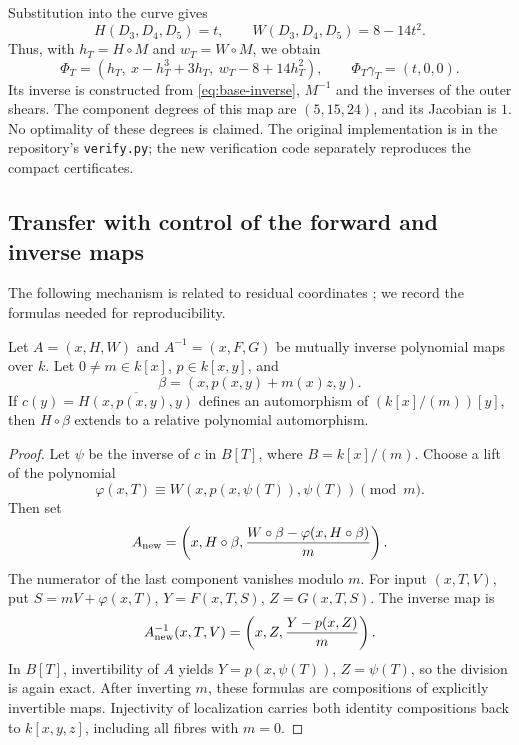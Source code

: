 Substitution into the curve gives
\[
 H(D_3,D_4,D_5)=t,\qquad W(D_3,D_4,D_5)=8-14t^2.
\]
Thus, with $h_T=H\circ M$ and $w_T=W\circ M$, we obtain
\begin{equation}\label{eq:trefoil-rectifier}
 \Phi_T=(h_T,\ x-h_T^3+3h_T,\ w_T-8+14h_T^2),
 \qquad \Phi_T\gamma_T=(t,0,0).
\end{equation}
Its inverse is constructed from \eqref{eq:base-inverse}, $M^{-1}$ and the
inverses of the outer shears. The component degrees of this map are
$(5,15,24)$, and its Jacobian is $1$. No optimality of these degrees is claimed.
The original implementation is in the repository's \texttt{verify.py};
the new verification code separately reproduces the compact certificates.

\subsection{Transfer with control of the forward and inverse maps}
The following mechanism is related to residual coordinates
\cite{BD1993,EV2001,Lewis2024}; we record the formulas needed for
reproducibility.

\begin{proposition}\label{prop:transfer-app2}
Let $A=(x,H,W)$ and $A^{-1}=(x,F,G)$ be mutually inverse polynomial
maps over $k$. Let $0\ne m\in k[x]$, $p\in k[x,y]$, and
\[
 \beta=(x,p(x,y)+m(x)z,y).
\]
If $c(y)=\overline{H(x,p(x,y),y)}$ defines an automorphism of
$(k[x]/(m))[y]$, then $H\circ\beta$ extends to a relative
polynomial automorphism.
\end{proposition}
\begin{proof}
Let $\psi$ be the inverse of $c$ in $B[T]$, where $B=k[x]/(m)$.
Choose a lift of the polynomial
\[
 \varphi(x,T)\equiv W(x,p(x,\psi(T)),\psi(T))\pmod m.
\]
Then set
\begin{equation}\label{eq:transfer-forward}
 A_{\rm new}=
 \left(x,H\circ\beta,
 \frac{W\circ\beta-\varphi(x,H\circ\beta)}m\right).
\end{equation}
The numerator of the last component vanishes modulo $m$.
For input $(x,T,V)$, put
$S=mV+\varphi(x,T)$, $Y=F(x,T,S)$, $Z=G(x,T,S)$. The inverse map is
\begin{equation}\label{eq:transfer-inverse}
 A_{\rm new}^{-1}(x,T,V)=\left(x,Z,\frac{Y-p(x,Z)}m\right).
\end{equation}
In $B[T]$, invertibility of $A$ yields
$Y=p(x,\psi(T))$, $Z=\psi(T)$, so the division is again exact.
After inverting $m$, these formulas are compositions of explicitly
invertible maps. Injectivity of localization carries both identity
compositions back to $k[x,y,z]$, including all fibres with $m=0$.
\end{proof}

